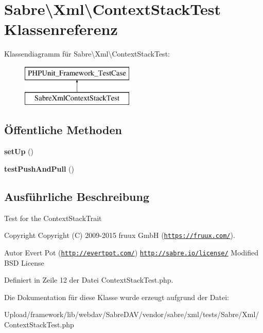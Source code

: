 \hypertarget{class_sabre_1_1_xml_1_1_context_stack_test}{}\section{Sabre\textbackslash{}Xml\textbackslash{}Context\+Stack\+Test Klassenreferenz}
\label{class_sabre_1_1_xml_1_1_context_stack_test}
Klassendiagramm für Sabre\textbackslash{}Xml\textbackslash{}Context\+Stack\+Test\+:\begin{figure}[H]
\begin{center}
\leavevmode
\includegraphics[height=2.000000cm]{class_sabre_1_1_xml_1_1_context_stack_test}
\end{center}
\end{figure}
\subsection*{Öffentliche Methoden}
\begin{DoxyCompactItemize}
\item 
\mbox{\label{class_sabre_1_1_xml_1_1_context_stack_test_ac9ae6ab409a5a83695a968a22b7f06db}} 
{\bfseries set\+Up} ()
\item 
\mbox{\label{class_sabre_1_1_xml_1_1_context_stack_test_a5bb447b7278b1a453d5cac04b1b5a77c}} 
{\bfseries test\+Push\+And\+Pull} ()
\end{DoxyCompactItemize}


\subsection{Ausführliche Beschreibung}
Test for the Context\+Stack\+Trait

\begin{DoxyCopyright}{Copyright}
Copyright (C) 2009-\/2015 fruux GmbH (\href{https://fruux.com/}{\tt https\+://fruux.\+com/}). 
\end{DoxyCopyright}
\begin{DoxyAuthor}{Autor}
Evert Pot (\href{http://evertpot.com/}{\tt http\+://evertpot.\+com/})  \href{http://sabre.io/license/}{\tt http\+://sabre.\+io/license/} Modified B\+SD License 
\end{DoxyAuthor}


Definiert in Zeile 12 der Datei Context\+Stack\+Test.\+php.



Die Dokumentation für diese Klasse wurde erzeugt aufgrund der Datei\+:\begin{DoxyCompactItemize}
\item 
Upload/framework/lib/webdav/\+Sabre\+D\+A\+V/vendor/sabre/xml/tests/\+Sabre/\+Xml/Context\+Stack\+Test.\+php\end{DoxyCompactItemize}
